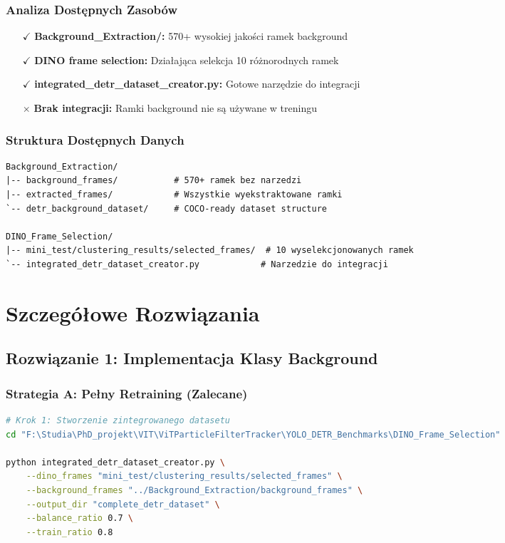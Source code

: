 \documentclass[12pt,a4paper]{article}
\begin{document}
\subsubsection{Analiza Dostępnych Zasobów}

\begin{itemize}
    \item[$\checkmark$] \textbf{Background\_Extraction/:} 570+ wysokiej jakości ramek background
    \item[$\checkmark$] \textbf{DINO frame selection:} Działająca selekcja 10 różnorodnych ramek
    \item[$\checkmark$] \textbf{integrated\_detr\_dataset\_creator.py:} Gotowe narzędzie do integracji
    \item[$\times$] \textbf{Brak integracji:} Ramki background nie są używane w treningu
\end{itemize}

\subsubsection{Struktura Dostępnych Danych}

\begin{verbatim}
Background_Extraction/
|-- background_frames/           # 570+ ramek bez narzedzi
|-- extracted_frames/            # Wszystkie wyekstraktowane ramki
`-- detr_background_dataset/     # COCO-ready dataset structure

DINO_Frame_Selection/
|-- mini_test/clustering_results/selected_frames/  # 10 wyselekcjonowanych ramek
`-- integrated_detr_dataset_creator.py            # Narzedzie do integracji
\end{verbatim}

\section{Szczegółowe Rozwiązania}

\subsection{Rozwiązanie 1: Implementacja Klasy Background}

\subsubsection{Strategia A: Pełny Retraining (Zalecane)}

\begin{lstlisting}[caption={Krok 1: Stworzenie zintegrowanego datasetu},label={lst:dataset_creation},language=bash]
# Krok 1: Stworzenie zintegrowanego datasetu
cd "F:\Studia\PhD_projekt\VIT\ViTParticleFilterTracker\YOLO_DETR_Benchmarks\DINO_Frame_Selection"

python integrated_detr_dataset_creator.py \
    --dino_frames "mini_test/clustering_results/selected_frames" \
    --background_frames "../Background_Extraction/background_frames" \
    --output_dir "complete_detr_dataset" \
    --balance_ratio 0.7 \
    --train_ratio 0.8
\end{lstlisting}
\end{document}

